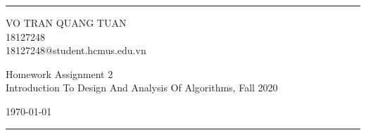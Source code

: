 \documentclass[a4paper]{article}
\begin{document}

\fancyhead[C]{}
\hrule \medskip %
\begin{minipage}{0.295\textwidth} 
\raggedright
\footnotesize
VO TRAN QUANG TUAN \hfill\\   
18127248\hfill\\
18127248@student.hcmus.edu.vn
\end{minipage}
\begin{minipage}{0.4\textwidth} 
\centering 
\large 
Homework Assignment 2\\ 
\normalsize 
Introduction To Design And Analysis Of Algorithms, Fall 2020\\ 
\end{minipage}
\begin{minipage}{0.295\textwidth} 
\raggedleft
\today\hfill\\
\end{minipage}
\medskip\hrule 
\bigskip

\tableofcontents 
\newpage
\end{document}
